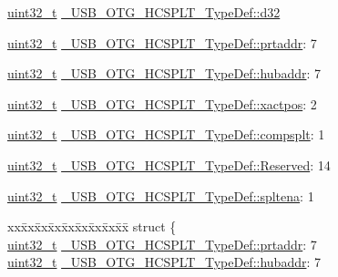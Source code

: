 \begin{DoxyCompactItemize}
\begin{tabbing}
\end{tabbing}\item 
\hyperlink{stdint_8h_a435d1572bf3f880d55459d9805097f62}{uint32\-\_\-t} \hyperlink{group___u_s_b___o_t_g___d_r_i_v_e_r_ga2d653fb915c46a2e964a551de1133d6f}{\-\_\-\-U\-S\-B\-\_\-\-O\-T\-G\-\_\-\-H\-C\-S\-P\-L\-T\-\_\-\-Type\-Def\-::d32}
\item 
\hyperlink{stdint_8h_a435d1572bf3f880d55459d9805097f62}{uint32\-\_\-t} \hyperlink{group___u_s_b___o_t_g___d_r_i_v_e_r_gacc448e71e7cef60de46bf9164a182940}{\-\_\-\-U\-S\-B\-\_\-\-O\-T\-G\-\_\-\-H\-C\-S\-P\-L\-T\-\_\-\-Type\-Def\-::prtaddr}\-: 7
\item 
\hyperlink{stdint_8h_a435d1572bf3f880d55459d9805097f62}{uint32\-\_\-t} \hyperlink{group___u_s_b___o_t_g___d_r_i_v_e_r_gaae0e95bdc2670ea39a5865a11402bbf2}{\-\_\-\-U\-S\-B\-\_\-\-O\-T\-G\-\_\-\-H\-C\-S\-P\-L\-T\-\_\-\-Type\-Def\-::hubaddr}\-: 7
\item 
\hyperlink{stdint_8h_a435d1572bf3f880d55459d9805097f62}{uint32\-\_\-t} \hyperlink{group___u_s_b___o_t_g___d_r_i_v_e_r_ga37c594251d0de7c398bcecae8f4a6780}{\-\_\-\-U\-S\-B\-\_\-\-O\-T\-G\-\_\-\-H\-C\-S\-P\-L\-T\-\_\-\-Type\-Def\-::xactpos}\-: 2
\item 
\hyperlink{stdint_8h_a435d1572bf3f880d55459d9805097f62}{uint32\-\_\-t} \hyperlink{group___u_s_b___o_t_g___d_r_i_v_e_r_ga13228295441150f61ba577a08d667dc7}{\-\_\-\-U\-S\-B\-\_\-\-O\-T\-G\-\_\-\-H\-C\-S\-P\-L\-T\-\_\-\-Type\-Def\-::compsplt}\-: 1
\item 
\hyperlink{stdint_8h_a435d1572bf3f880d55459d9805097f62}{uint32\-\_\-t} \hyperlink{group___u_s_b___o_t_g___d_r_i_v_e_r_gae2693cd0a5bd810cb890f111e78c0b35}{\-\_\-\-U\-S\-B\-\_\-\-O\-T\-G\-\_\-\-H\-C\-S\-P\-L\-T\-\_\-\-Type\-Def\-::\-Reserved}\-: 14
\item 
\hyperlink{stdint_8h_a435d1572bf3f880d55459d9805097f62}{uint32\-\_\-t} \hyperlink{group___u_s_b___o_t_g___d_r_i_v_e_r_ga718ce486934cafa52254fe9597562689}{\-\_\-\-U\-S\-B\-\_\-\-O\-T\-G\-\_\-\-H\-C\-S\-P\-L\-T\-\_\-\-Type\-Def\-::spltena}\-: 1
\item 
\begin{tabbing}
xx\=xx\=xx\=xx\=xx\=xx\=xx\=xx\=xx\=\kill
struct \{\\
\>\hyperlink{stdint_8h_a435d1572bf3f880d55459d9805097f62}{uint32\_t} \hyperlink{group___u_s_b___o_t_g___d_r_i_v_e_r_gacc448e71e7cef60de46bf9164a182940}{\_USB\_OTG\_HCSPLT\_TypeDef::prtaddr}: 7\\
\>\hyperlink{stdint_8h_a435d1572bf3f880d55459d9805097f62}{uint32\_t} \hyperlink{group___u_s_b___o_t_g___d_r_i_v_e_r_gaae0e95bdc2670ea39a5865a11402bbf2}{\_USB\_OTG\_HCSPLT\_TypeDef::hubaddr}: 7\\

\end{tabbing}
\end{DoxyCompactItemize}
